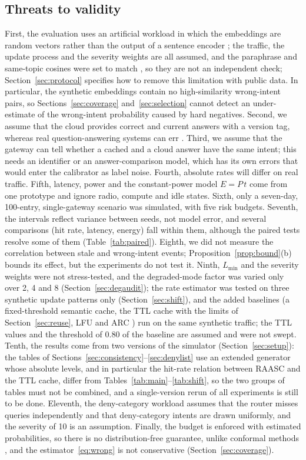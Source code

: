\documentclass[journal]{IEEEtran}
\begin{document}
\subsection{Threats to validity}\label{sec:threats}
First, the evaluation uses an artificial workload in which the embeddings are random vectors rather than the output of a sentence encoder \cite{reimers2019}; the traffic, the update process and the severity weights are all assumed, and the paraphrase and same-topic cosines were set to match \cite{montoya2025}, so they are not an independent check; Section~\ref{sec:protocol} specifies how to remove this limitation with public data. In particular, the synthetic embeddings contain no high-similarity wrong-intent pairs, so Sections~\ref{sec:coverage} and~\ref{sec:selection} cannot detect an under-estimate of the wrong-intent probability caused by hard negatives. Second, we assume that the cloud provides correct and current answers with a version tag, whereas real question-answering systems can err \cite{ji2023,singhal2023}. Third, we assume that the gateway can tell whether a cached and a cloud answer have the same intent; this needs an identifier or an answer-comparison model, which has its own errors that would enter the calibrator as label noise. Fourth, absolute rates will differ on real traffic. Fifth, latency, power and the constant-power model $E=P\,t$ come from one prototype \cite{montoya2025} and ignore radio, compute and idle states. Sixth, only a seven-day, 100-entry, single-gateway scenario was simulated, with five risk budgets. Seventh, the intervals reflect variance between seeds, not model error, and several comparisons (hit rate, latency, energy) fall within them, although the paired tests resolve some of them (Table~\ref{tab:paired}). Eighth, we did not measure the correlation between stale and wrong-intent events; Proposition~\ref{prop:bound}(b) bounds its effect, but the experiments do not test it. Ninth, $L_{\min}$ and the severity weights were not stress-tested, and the degraded-mode factor was varied only over 2, 4 and 8 (Section~\ref{sec:degaudit}); the rate estimator was tested on three synthetic update patterns only (Section~\ref{sec:shift}), and the added baselines (a fixed-threshold semantic cache, the TTL cache with the limits of Section~\ref{sec:reuse}, LFU and ARC \cite{megiddo2003}) run on the same synthetic traffic; the TTL values and the threshold of 0.80 of the baseline are assumed and were not swept. Tenth, the results come from two versions of the simulator (Section~\ref{sec:setup}): the tables of Sections~\ref{sec:consistency}--\ref{sec:denylist} use an extended generator whose absolute levels, and in particular the hit-rate relation between RAASC and the TTL cache, differ from Tables~\ref{tab:main}--\ref{tab:shift}, so the two groups of tables must not be combined, and a single-version rerun of all experiments is still to be done. Eleventh, the deny-category workload assumes that the router misses queries independently and that deny-category intents are drawn uniformly, and the severity of 10 is an assumption. Finally, the budget is enforced with estimated probabilities, so there is no distribution-free guarantee, unlike conformal methods \cite{angelopoulos2021}, and the estimator~\eqref{eq:wrong} is not conservative (Section~\ref{sec:coverage}).
\end{document}
